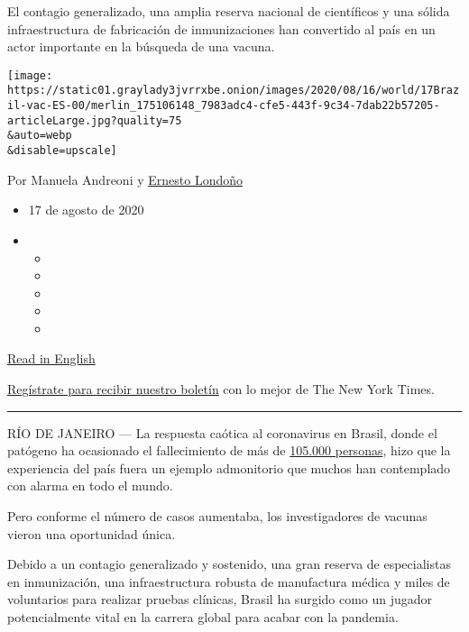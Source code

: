 El contagio generalizado, una amplia reserva nacional de científicos y
una sólida infraestructura de fabricación de inmunizaciones han
convertido al país en un actor importante en la búsqueda de una vacuna.

\texttt{[image: https://static01.graylady3jvrrxbe.onion/images/2020/08/16/world/17Brazil-vac-ES-00/merlin\_175106148\_7983adc4-cfe5-443f-9c34-7dab22b57205-articleLarge.jpg?quality=75\\\&auto=webp\\\&disable=upscale]}

Por Manuela Andreoni y
\href{https://www.nytimes3xbfgragh.onion/by/ernesto-londono}{Ernesto
Londoño}

\begin{itemize}
\item
  17 de agosto de 2020
\item
  \begin{itemize}
  \item
  \item
  \item
  \item
  \item
  \end{itemize}
\end{itemize}

\href{https://www.nytimes3xbfgragh.onion/2020/08/15/world/americas/brazil-coronavirus-vaccine.html}{Read
in English}

\href{https://www.nytimes3xbfgragh.onion/newsletters/el-times}{Regístrate
para recibir nuestro boletín} con lo mejor de The New York Times.

\begin{center}\rule{0.5\linewidth}{\linethickness}\end{center}

RÍO DE JANEIRO --- La respuesta caótica al coronavirus en Brasil, donde
el patógeno ha ocasionado el fallecimiento de más de
\href{https://covid.saude.gov.br/}{105.000 personas}, hizo que la
experiencia del país fuera un ejemplo admonitorio que muchos han
contemplado con alarma en todo el mundo.

Pero conforme el número de casos aumentaba, los investigadores de
vacunas vieron una oportunidad única.

Debido a un contagio generalizado y sostenido, una gran reserva de
especialistas en inmunización, una infraestructura robusta de
manufactura médica y miles de voluntarios para realizar pruebas
clínicas, Brasil ha surgido como un jugador potencialmente vital en la
carrera global para acabar con la pandemia.

